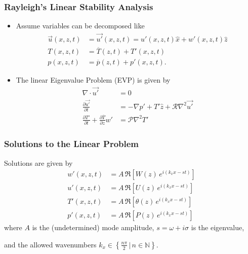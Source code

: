 \section{}
\begin{frame}[fragile]
    \frametitle{Rayleigh's Linear Stability Analysis}
    \begin{itemize}
        \item Assume variables can be decomposed like 
        \begin{align}
            \vec{u}(x, z, t) &= \vec{u'}(x, z, t) \label{EQ:reynolds_dc_u} = u'(x, z, t)\hat{x} + w'(x, z, t)\hat{z} \\
            T(x, z, t) &= \overline{T}(z, t) + T'(x, z, t) \label{EQ:reynolds_dc_T}\\
            p(x, z, t) &= \overline{p}(z, t) +  p'(x, z, t). \label{EQ:reynolds_dc_p}
        \end{align}
        \item The linear Eigenvalue Problem (EVP) is given by
        \begin{align}
            \nabla \cdot \vec{u'} &= 0 \label{EQ:linear1}\\
            \frac{\partial\vec{u'}}{\partial t} &= - \nabla p' + T'\hat{z} + \mathcal{R} \nabla^2 \vec{u'} \label{EQ:linear2}\\
            \frac{\partial T'}{\partial t} + \frac{\partial \overline{T}}{\partial z} w' &= \mathcal{P} \nabla^2 T' \label{EQ:linear3}
        \end{align}
    \end{itemize}
    
\end{frame}

\begin{frame}[fragile]
    \frametitle{Solutions to the Linear Problem}
        Solutions are given by
        \begin{align}
            w'(x, z, t) &= A\, \Re\left[W(z) \, e^{i(k_xx-st)}\right] \label{EQ:normal_modes1}\\ 
            u'(x, z, t) &= A\, \Re\left[U(z) \, e^{i(k_xx-st)}\right] \label{EQ:normal_modes2}\\ 
            T'(x, z, t) &= A\, \Re\left[\theta(z) \, e^{i(k_xx-st)}\right] \label{EQ:normal_modes3}\\ 
            p'(x, z, t) &= A\, \Re\left[P(z) \, e^{i(k_xx-st)}\right] \label{EQ:normal_modes4}
        \end{align}
        where $A$ is the (undetermined) mode amplitude, $s = \omega + i\sigma$ is the eigenvalue, \newline
        
        and the allowed wavenumbers $k_x \in \left\{\frac{n\pi}{2} \, \big| \, n \in \mathbb{N}\right\}$.
    
\end{frame}

